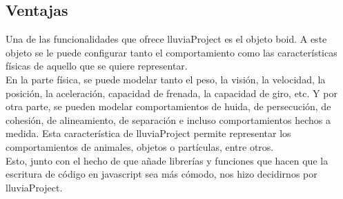 \subsection{Ventajas}
\label{subsection:ventajas}


Una de las funcionalidades que ofrece lluviaProject es el objeto boid. A este objeto se le puede configurar tanto el comportamiento como las 
características físicas de aquello que se quiere representar.\\

En la parte física, se puede modelar tanto el peso, la visión, la velocidad, la posición, la aceleración, capacidad de frenada, la capacidad 
de giro, etc. Y por otra parte, se pueden modelar comportamientos de huida, de persecución, de cohesión, de alineamiento, de separación e 
incluso comportamientos hechos a medida. Esta característica de lluviaProject permite representar los comportamientos de animales, objetos 
o partículas, entre otros.\\

Esto, junto con el hecho de que añade librerías y funciones que hacen que la escritura de código en javascript sea más cómodo, nos hizo 
decidirnos por lluviaProject.\\
